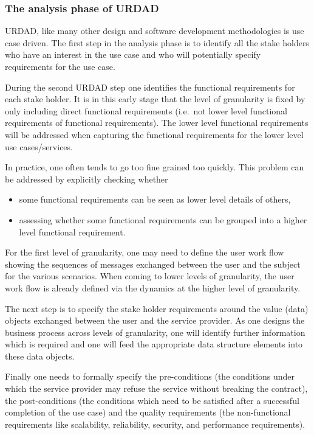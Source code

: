 \documentclass[reviewcopy]{elsart}
\begin{document}

\subsubsection{The analysis phase of URDAD}

URDAD, like many other design and software development methodologies is use
case driven. The first step in the analysis phase is to identify
all the stake holders who have an interest in the use case and who will
potentially specify requirements for the use case.

During the second URDAD step one identifies the functional requirements for each stake
holder. It is in this early stage that the level of granularity is fixed by only including
direct functional requirements (i.e.\ not lower level functional requirements of functional
requirements). The lower level functional requirements will be addressed when capturing
the functional requirements for the lower level use cases/services.

In practice, one often tends to go too fine grained too quickly. This problem can be addressed
by explicitly checking whether
\begin{itemize}
  \item some functional requirements can be seen as lower level details of others,
  \item assessing whether some functional requirements can be grouped into a higher
			level functional requirement.
\end{itemize}

For the first level of granularity, one may need to define the user work flow
showing the sequences of messages exchanged between the user and the subject
for the various scenarios. When coming to lower levels of granularity, the
user work flow is already defined via the dynamics at the higher level of
granularity.

The next step is to specify the stake holder requirements around the value
(data) objects exchanged between the user and the service provider. As one
designs the business process across levels of granularity, one will identify
further information which is required and one will feed the appropriate
data structure elements into these data objects.

Finally one needs to formally specify the pre-conditions (the conditions under
which the service provider may refuse the service without breaking the
contract), the post-conditions (the conditions which need to be satisfied after
a successful completion of the use case) and the quality requirements (the
non-functional requirements like scalability, reliability, security, and
performance requirements).
\end{document}
